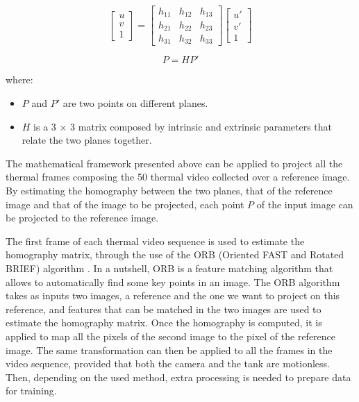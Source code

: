 \begin{equation}
    \begin{bmatrix} u\\ v\\ 1 \end{bmatrix} = 
        \begin{bmatrix}
        h_{11}& h_{12} & h_{13} \\ 
        h_{21}& h_{22} & h_{23} \\
        h_{31}& h_{32} & h_{33}
        \end{bmatrix}
        \begin{bmatrix} u'\\ v'\\ 1 \end{bmatrix}
\end{equation}

\begin{equation} \label{projection}
P=HP'
\end{equation}

where:

\begin{itemize}
    \item $P$ and $P'$ are two points on different planes.
    \item $H$ is a 3 $\times$ 3 matrix composed by intrinsic and extrinsic parameters that relate the two planes together.
\end{itemize}


The mathematical framework presented above can be applied to project all the thermal frames composing the 50 thermal video collected over a reference image. By estimating the homography between the two planes, that of the reference image and that of the image to be projected, each point $P$ of the input image can be projected to the reference image. 

The first frame of each thermal video sequence is used to estimate the homography matrix, through the use of the ORB (Oriented FAST and Rotated BRIEF) algorithm \citep{rublee2011orb}. In a nutshell, ORB is a feature matching algorithm that allows to automatically find some key points in an image. The ORB algorithm takes as inputs two images, a reference and the one we want to project on this reference, and features that can be matched in the two images are used to estimate the homography matrix. Once the homography is computed, it is applied to map all the pixels of the second image to the pixel of the reference image. The same transformation can then be applied to all the frames in the video sequence, provided that both the camera and the tank are motionless. 
%
Then, depending on the used method, extra processing is needed to prepare data for training.

